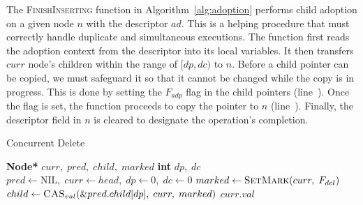 \documentclass[10pt,conference,compsocconf]{IEEEtran}
\newcommand\NIL{\text{NIL}}
\newcommand\TRUE{\text{\textbf{true}}}
\begin{document}
The \textsc{FinishInserting} function in Algorithm~\ref{alg:adoption} performs child adoption on a given node $n$ with the descriptor $ad$.
This is a helping procedure that must correctly handle duplicate and simultaneous executions.
The function first reads the adoption context from the descriptor into its local variables.
It then transfers $curr$ node's children within the range of $[dp, dc)$ to $n$.
Before a child pointer can be copied, we must safeguard it so that it cannot be changed while the copy is in progress.
This is done by setting the $F_{adp}$ flag in the child pointers (line~).
Once the flag is set, the function proceeds to copy the pointer to $n$ (line~). 
Finally, the descriptor field in $n$ is cleared to designate the operation's completion.

\begin{algorithm}[t]
    \caption{Concurrent Delete}
    \label{alg:delete}
    \begin{algorithmic}[1]
        \State \textbf{Node*} $curr,\;pred,\;child,\;marked$ 
        \State \textbf{int} $dp,\;dc$ 
        \While{\TRUE}
        \State $pred \gets \NIL,\;curr \gets head,\;dp \gets 0,\;dc \gets 0$ \label{l:delfromhead}
        \State {} \label{l:locpredel}
         \label{l:checkexist}
        \State \Return \NIL \label{l:term1}
        \EndIf
        \State $marked \gets \textsc{SetMark}(curr,\;F_{del})$
        \State $child \gets \textsc{CAS}_{val}(\&pred.child[dp],\;curr,\;marked)$ \label{l:markdel}
         \label{l:cond1}
         \label{l:cond2}
        \State \Return $curr.val$
         \label{l:cond3}
        \State \Return \NIL
        \EndIf
        \EndIf
        \EndWhile
        \EndFunction
    \end{algorithmic}
\end{algorithm}
\end{document}
